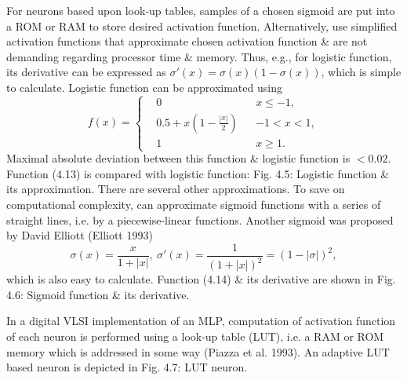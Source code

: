 \documentclass{article}
\begin{document}
\begin{enumerate}
\begin{itemize}
\begin{itemize}
			For neurons based upon look-up tables, samples of a chosen sigmoid are put into a ROM or RAM to store desired activation function. Alternatively, use simplified activation functions that approximate chosen activation function \& are not demanding regarding processor time \& memory. Thus, e.g., for logistic function, its derivative can be expressed as $\sigma'(x) = \sigma(x)(1 - \sigma(x))$, which is simple to calculate. Logistic function can be approximated using
			\begin{equation}
				f(x) = \left\{\begin{split}
					&0&&x\le-1,\\
					&0.5 + x\left(1 - \frac{|x|}{2}\right)&&-1 < x < 1,\\
					&1&&x\ge1.
				\end{split}\right.
			\end{equation}
			Maximal absolute deviation between this function \& logistic function is $< 0.02$. Function (4.13) is compared with logistic function: {\sf Fig. 4.5: Logistic function \& its approximation}. There are several other approximations. To save on computational complexity, can approximate sigmoid functions with a series of straight lines, i.e. by a piecewise-linear functions. Another sigmoid was proposed by {\sc David Elliott} (Elliott 1993)
			\begin{equation}
				\sigma(x) = \frac{x}{1 + |x|},\ \sigma'(x) = \frac{1}{(1 + |x|)^2} = (1 - |\sigma|)^2,
			\end{equation}
			which is also easy to calculate. Function (4.14) \& its derivative are shown in {\sf Fig. 4.6: Sigmoid function \& its derivative}.
			
			In a digital VLSI implementation of an MLP, computation of activation function of each neuron is performed using a look-up table (LUT), i.e. a RAM or ROM memory which is addressed in some way (Piazza et al. 1993). An adaptive LUT based neuron is depicted in {\sf Fig. 4.7: LUT neuron}.
			

\end{itemize}
\end{itemize}
\end{enumerate}
\end{document}
